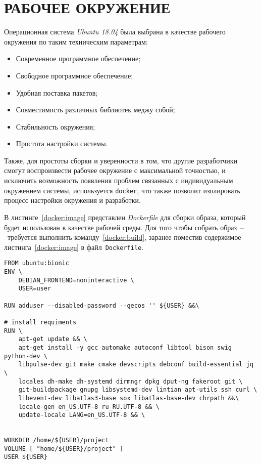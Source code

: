 \chapter{РАБОЧЕЕ ОКРУЖЕНИЕ}


Операционная система \textit{Ubuntu 18.04} была выбрана в качестве рабочего
окружения по таким техническим параметрам:

\begin{itemize}
    \item Современное программное обеспечение;
    \item Свободное программное обеспечение;
    \item Удобная поставка пакетов;
    \item Совместимость различных библиотек меджу собой;
    \item Стабильность окружения;
    \item Простота настройки системы.
\end{itemize}

Также, для простоты сборки и уверенности в том, что другие разработчики смогут
воспроизвести рабочее окружение с максимальной точностью, и исключить
возможность появления проблем связанных с индивидуальным окружением системы,
используется \texttt{docker}, что также позволит изолировать процесс настройки
окружения и разработки.

В листинге~\ref{docker:image} представлен \textit{Dockerfile} для сборки образа,
который будет использован в качестве рабочей среды. Для того чтобы собрать
образ~--~требуется выполнить команду~\ref{docker:build}, заранее поместив
содержимое листинга~\ref{docker:image} в \linebreak файл~\texttt{Dockerfile}.

\begin{lstlisting}[caption={Dockerfile}, label={docker:image}]
FROM ubuntu:bionic
ENV \
    DEBIAN_FRONTEND=noninteractive \
    USER=user

RUN adduser --disabled-password --gecos '' ${USER} &&\

# install requiments
RUN \
    apt-get update && \
    apt-get install -y gcc automake autoconf libtool bison swig python-dev \
    libpulse-dev git make cmake devscripts debconf build-essential jq \
    locales dh-make dh-systemd dirmngr dpkg dput-ng fakeroot git \
    git-buildpackage gnupg libsystemd-dev lintian apt-utils ssh curl \
    libevent-dev libatlas3-base sox libatlas-base-dev chrpath &&\
    locale-gen en_US.UTF-8 ru_RU.UTF-8 && \
    update-locale LANG=en_US.UTF-8 && \


WORKDIR /home/${USER}/project
VOLUME [ "home/${USER}/project" ]
USER ${USER}
\end{lstlisting}

